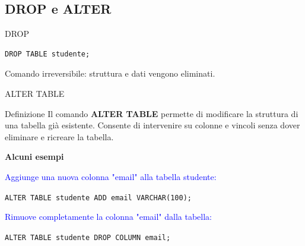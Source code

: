 \documentclass{beamer}
\begin{document}
\subsection{DROP e ALTER}

\begin{frame}[fragile]{DROP}
\small
\begin{verbatim}
DROP TABLE studente;
\end{verbatim}

\medskip
\alert{Comando irreversibile: struttura e dati vengono eliminati.}
\end{frame}

\begin{frame}{ALTER TABLE}
\small
\begin{block}{Definizione}
Il comando \textbf{ALTER TABLE} permette di modificare la struttura di una tabella già esistente.
Consente di intervenire su colonne e vincoli senza dover eliminare e ricreare la tabella.
\end{block}

\medskip
\textbf{Alcuni esempi}

\medskip
\textcolor{blue}{Aggiunge una nuova colonna "email" alla tabella studente:}

\texttt{ALTER TABLE studente ADD email VARCHAR(100);}


\bigskip

\textcolor{blue}{Rimuove completamente la colonna "email" dalla tabella:}

\texttt{ALTER TABLE studente DROP COLUMN email;}

\end{frame}
\end{document}
